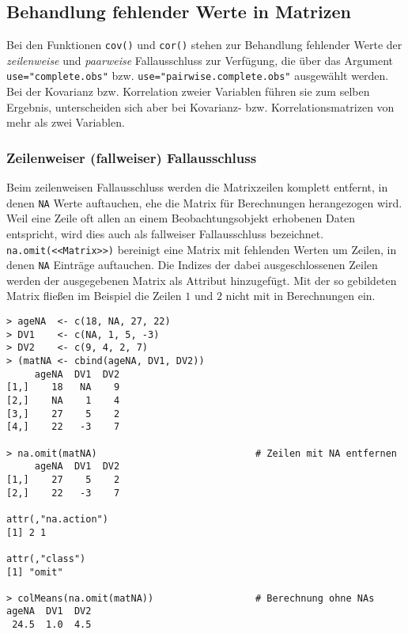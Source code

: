\subsection{Behandlung fehlender Werte in Matrizen}
\label{sec:naMat}

Bei den Funktionen \lstinline!cov()! und \lstinline!cor()! stehen zur Behandlung fehlender Werte der \emph{zeilenweise} und \emph{paarweise} Fallausschluss zur Verfügung, die über das Argument \lstinline!use="complete.obs"! bzw. \lstinline!use="pairwise.complete.obs"! ausgewählt werden. Bei der Kovarianz bzw. Korrelation zweier Variablen führen sie zum selben Ergebnis,
unterscheiden sich aber bei Kovarianz- bzw. Korrelationsmatrizen von mehr als zwei Variablen.

\subsubsection{Zeilenweiser (fallweiser) Fallausschluss}

Beim zeilenweisen Fallausschluss werden die Matrixzeilen komplett entfernt, in denen \lstinline!NA! Werte auftauchen, ehe die Matrix für Berechnungen herangezogen wird. Weil eine Zeile oft allen an einem Beobachtungsobjekt erhobenen Daten entspricht, wird dies auch als fallweiser Fallausschluss bezeichnet.  \lstinline!na.omit(<<Matrix>>)! bereinigt eine Matrix mit fehlenden Werten um Zeilen, in denen \lstinline!NA! Einträge auftauchen. Die Indizes der dabei ausgeschlossenen Zeilen werden der ausgegebenen Matrix als Attribut hinzugefügt. Mit der so gebildeten Matrix fließen im Beispiel die Zeilen $1$ und $2$ nicht mit in Berechnungen ein.
\begin{lstlisting}
> ageNA  <- c(18, NA, 27, 22)
> DV1    <- c(NA, 1, 5, -3)
> DV2    <- c(9, 4, 2, 7)
> (matNA <- cbind(ageNA, DV1, DV2))
     ageNA  DV1  DV2
[1,]    18   NA    9
[2,]    NA    1    4
[3,]    27    5    2
[4,]    22   -3    7

> na.omit(matNA)                            # Zeilen mit NA entfernen
     ageNA  DV1  DV2
[1,]    27    5    2
[2,]    22   -3    7

attr(,"na.action")
[1] 2 1

attr(,"class")
[1] "omit"

> colMeans(na.omit(matNA))                  # Berechnung ohne NAs
ageNA  DV1  DV2
 24.5  1.0  4.5
\end{lstlisting}

